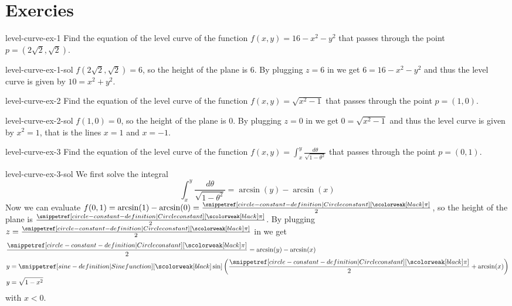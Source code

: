 \documentclass[preview]{standalone}
\begin{document}
\genpage

\section{Exercies}

\begin{snippetexercise}{level-curve-ex-1}{}
    Find the equation of the level curve of the function \(f(x,y) = 16-x^2-y^2\)
    that passes through the point \(p=(2\sqrt{2}, \sqrt{2})\).
\end{snippetexercise}

\begin{snippetsolution}{level-curve-ex-1-sol}{}
    \phantom{}\(f(2\sqrt{2}, \sqrt{2}) = 6\), so the height of the plane is 6.
    By plugging \(z=6\) in we get \(6=16-x^2-y^2\)
    and thus the level curve is given by \(10=x^2+y^2\).
\end{snippetsolution}

\begin{snippetexercise}{level-curve-ex-2}{}
    Find the equation of the level curve of the function \(f(x,y) = \sqrt{x^2-1}\)
    that passes through the point \(p=(1,0)\).
\end{snippetexercise}

\begin{snippetsolution}{level-curve-ex-2-sol}{}
    \phantom{}\(f(1, 0) = 0\), so the height of the plane is 0.
    By plugging \(z=0\) in we get \(0 = \sqrt{x^2-1}\)
    and thus the level curve is given by \(x^2=1\), that is
    the lines \(x=1\) and \(x=-1\).
\end{snippetsolution}

\begin{snippetexercise}{level-curve-ex-3}{}
    Find the equation of the level curve of the function \(f(x,y) = \int_x^y \frac{d\theta}{\sqrt{1-\theta^2}}\)
    that passes through the point \(p=(0,1)\).
\end{snippetexercise}

\begin{snippetsolution}{level-curve-ex-3-sol}{}
    We first solve the integral
    \[ \int_x^y \frac{d\theta}{\sqrt{1-\theta^2}} = \arcsin(y) - \arcsin(x) \]
    Now we can evaluate \(f(0,1) = \arcsin(1) - \arcsin(0) = \frac{\picircle}{2}\),
    so the height of the plane is \(\frac{\picircle}{2}\).
    By plugging \(z=\frac{\picircle}{2}\) in we get
    \begin{align*}
        &\frac{\picircle}{2} = \arcsin(y) - \arcsin(x) \\
        &y = \sin\left( \frac{\picircle}{2} + \arcsin(x) \right) \\
        &y = \sqrt{1-x^2}
    \end{align*}
    with \(x < 0\).
\end{snippetsolution}
\end{document}
